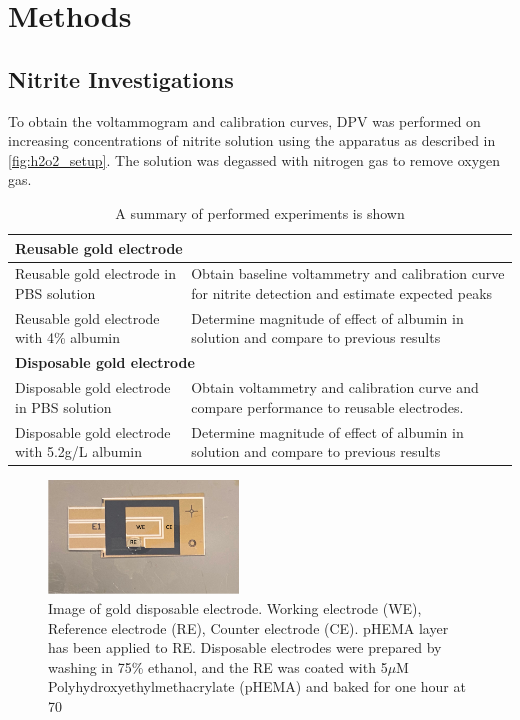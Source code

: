 \section{Methods}
\vspace{-0.5cm}
\subsection{Nitrite Investigations}
\vspace{-0.5cm}
To obtain the voltammogram and calibration curves, DPV was performed on increasing concentrations of nitrite solution using the apparatus as described in \autoref{fig:h2o2_setup}. The solution was degassed with nitrogen gas to remove oxygen gas.\\
\begin{table}[H]
    \centering
    \begin{tabular}{ |p{3.7cm}||p{3.7cm}| } 
        \hline
        \multicolumn{2}{|l|}{\textbf{Reusable gold electrode}} \\ \hline
        Reusable gold electrode in PBS solution & Obtain baseline voltammetry and calibration curve for nitrite detection and estimate expected peaks\\ \hline
        Reusable gold electrode with 4\% albumin & Determine magnitude of effect of albumin in solution and compare to previous results \\ \hline
        \multicolumn{2}{|l|}{\textbf{Disposable gold electrode}} \\ \hline
    Disposable gold electrode in PBS solution & Obtain voltammetry and calibration curve and compare performance to reusable electrodes. \\ \hline
    Disposable gold electrode with 5.2g/L albumin & Determine magnitude of effect of albumin in solution and compare to previous results\\ \hline
    \end{tabular}
    \caption{A summary of performed experiments is shown}
    \label{tab:my_label}
\end{table}




\begin{figure}[H]
\centering
\includegraphics[width=0.45\textwidth]{img/disp electrode.PNG}
\caption{Image of gold disposable electrode. Working electrode (WE), Reference electrode (RE), Counter electrode (CE). pHEMA layer has been applied to RE. Disposable electrodes were prepared by washing in 75\% ethanol, and the RE was coated with 5$\mu$M Polyhydroxyethylmethacrylate (pHEMA) and baked for one hour at 70}
\end{figure}


